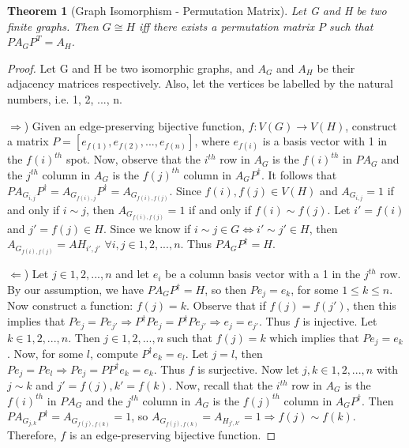 \documentclass[12pt]{article}
\newtheorem{thm}{Theorem}[section]
\begin{document}
\begin{thm}[Graph Isomorphism - Permutation Matrix]
\label{permutation}
Let G and H be two finite graphs. Then $G \cong H$ iff there exists a permutation matrix $P$ such that $PA_GP^T = A_H$.
\end{thm}

\begin{proof}
Let G and H be two isomorphic graphs, and $A_G$ and $A_H$ be their adjacency matrices respectively. Also, let the vertices be labelled by the natural numbers, i.e. 1, 2, ..., n.

$\Rightarrow$) Given an edge-preserving bijective function, $f:V(G) \to V(H)$, construct a matrix $P = [e_{f(1)}, e_{f(2)}, ..., e_{f(n)}]$, where $e_{f(i)}$ is a basis vector with 1 in the $f(i)^{th}$ spot. Now, observe that the $i^{th}$ row in $A_G$ is the $f(i)^{th}$ in $PA_G$ and the $j^{th}$ column in $A_G$ is the $f(j)^{th}$ column in $A_GP^{\dag}$. It follows that $PA_{G_{i, j}}P^{\dag} = A_{G_{f(i), j}}P^{\dag} = A_{G_{f(i), f(j)}}$. Since $f(i), f(j) \in V(H)$ and $A_{G_{i, j}} = 1$ if and only if $i \sim j$, then $A_{G_{f(i), f(j)}} = 1$ if and only if $f(i) \sim f(j)$. Let $i' = f(i)$ and $j' = f(j) \in H$. Since we know if $i \sim j \in G \Leftrightarrow i' \sim j' \in H$, then $A_{G_{f(i), f(j)}} = A{H_{i', j'}}$ $\forall i, j \in 1, 2, ..., n$. Thus $PA_GP^{\dag} = H$.

$\Leftarrow$) Let $j \in 1, 2, ..., n$ and let $e_i$ be a column basis vector with a 1 in the $j^{th}$ row. By our assumption, we have $PA_GP^{\dag} = H$, so then $Pe_j = e_k$, for some $1 \leq k \leq n$. Now construct a function: $f(j) = k$. Observe that if $f(j) = f(j')$, then this implies that $Pe_j = Pe_{j'} \Rightarrow P^{\dag}Pe_j = P^{\dag}Pe_{j'} \Rightarrow e_j = e_{j'}$. Thus $f$ is injective. Let $k \in 1, 2, ..., n$. Then $j \in 1, 2, ..., n$ such that $f(j) = k$ which implies that $Pe_j = e_k$. Now, for some $l$, compute $P^{\dag}e_k = e_l$. Let $j = l$, then $Pe_j = Pe_l \Rightarrow Pe_j = PP^{\dag}e_k = e_k$. Thus $f$ is surjective. Now let $j, k \in 1, 2, ..., n$ with $j \sim k$ and $j' = f(j), k' = f(k)$. Now, recall that the $i^{th}$ row in $A_G$ is the $f(i)^{th}$ in $PA_G$ and the $j^{th}$ column in $A_G$ is the $f(j)^{th}$ column in $A_GP^{\dag}$. Then $PA_{G_{j, k}}P^{\dag} = A_{G_{f(j), f(k)}} = 1$, so $A_{G_{f(j), f(k)}} = A_{H_{j', k'}} = 1 \Rightarrow f(j) \sim f(k)$. Therefore, $f$ is an edge-preserving bijective function.

\end{proof}
\end{document}

